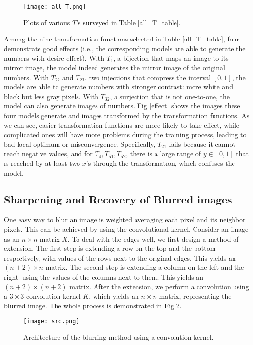 \documentclass{article}
\begin{document}
\begin{figure}[!h]
  \centering
  \texttt{[image: all\_T.png]}\\
  \caption{Plots of various $T$'s surveyed in Table
  \ref{all_T_table}.}\label{all_T}
\end{figure}


Among the nine transformation functions selected in Table \ref{all_T_table}, four demonstrate good effects (i.e., the corresponding models are able to generate the numbers with desire effect). With $T_1$, a bijection that maps an image to its mirror image, the model indeed generates the mirror image of the original numbers. With $T_{22}$ and $T_{23}$, two injections that compress the interval $[0,1]$, the models are able to generate numbers with stronger contrast: more white and black but less gray pixels. With $T_{32}$, a surjection that is not one-to-one, the model can also generate images of numbers. Fig \ref{effect} shows the images these four models generate and images transformed by the transformation functions. As we can see, easier transformation functions are more likely to take effect, while complicated ones will have more problems during the training process, leading to bad local optimum or misconvergence. Specifically, $T_{21}$ fails because it cannot reach negative values, and for $T_4, T_{51}, T_{52}$, there is a large range of $y\in[0,1]$ that is reached by at least two $x$'s through the transformation, which confuses the model.



\subsection{Sharpening and Recovery of Blurred images}
One easy way to blur an image is weighted averaging each pixel and its neighbor pixels. This can be achieved by using the convolutional kernel. Consider an image as an $n\times n$ matrix $X$. To deal with the edges well, we first design a method of extension. The first step is extending a row on the top and the bottom respectively, with values of the rows next to the original edges. This yields an $(n+2)\times n$ matrix. The second step is extending a column on the left and the right, using the values of the columns next to them. This yields an $(n+2)\times (n+2)$ matrix. After the extension, we perform a convolution using a $3\times 3$ convolution kernel $K$, which yields an $n\times n$ matrix, representing the blurred image. The whole process is demonstrated in Fig \ref{process}.
\begin{figure}[!h]
\centering
\texttt{[image: src.png]}
\caption{Architecture of the blurring method using a convolution kernel.}
\label{process}
\end{figure}
\end{document}
